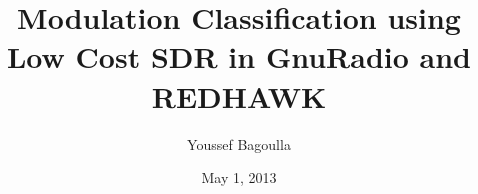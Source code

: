\title{Modulation Classification using Low Cost SDR in GnuRadio and REDHAWK}
\date{May 1, 2013}
\author{Youssef Bagoulla}